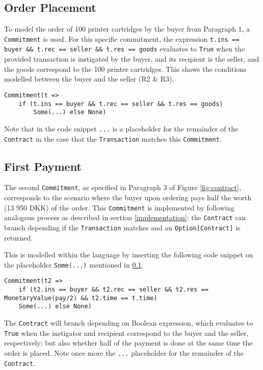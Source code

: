 \documentclass{ituthesis}
\begin{document}
\subsection{Order Placement} \label{order}
To model the order of 100 printer cartridges by the buyer from Paragraph 1, a \texttt{Commitment} is used. For this specific commitment, the expression \texttt{t.ins == buyer \&\& t.rec == seller \&\& t.res == goods} evaluates to \texttt{True} when the provided transaction is instigated by the buyer, and its recipient is the seller, and the goods correspond to the 100 printer cartridges. This shows the conditions modelled between the buyer and the seller (R2 \& R3).
\begin{lstlisting}
Commitment(t => 
    if (t.ins == buyer && t.rec == seller && t.res == goods) 
        Some(...) else None)
\end{lstlisting}

Note that in the code snippet \texttt{...} is a placeholder for the remainder of the \texttt{Contract} in the case that the \texttt{Transaction} matches this \texttt{Commitment}.

\subsection{First Payment} \label{payment}

The second \texttt{Commitment}, as specified in Paragraph 3 of Figure \ref{fig:contract}, corresponds to the scenario where the buyer upon ordering pays half the worth (13 950 DKK) of the order. This \texttt{Commitment} is implemented by following analogous process as described in section \ref{implementation}: the \texttt{Contract} can branch depending if the \texttt{Transaction} matches and an \texttt{Option[Contract]} is returned.

This is modelled within the language by inserting the following code snippet on the placeholder \texttt{Some(...)} mentioned in \ref{order}.
\begin{lstlisting}
Commitment(t2 =>
    if (t2.ins == buyer && t2.rec == seller && t2.res == MonetaryValue(pay/2) && t2.time == t.time)
    Some(...) else None)
\end{lstlisting}

The \texttt{Contract} will branch depending on Boolean expression, which evaluates to \texttt{True} when the instigator and recipient correspond to the buyer and the seller, respectively; but also whether half of the payment is done at the same time the order is placed. Note once more the \texttt{...} placeholder for the remainder of the \texttt{Contract}.
\end{document}
